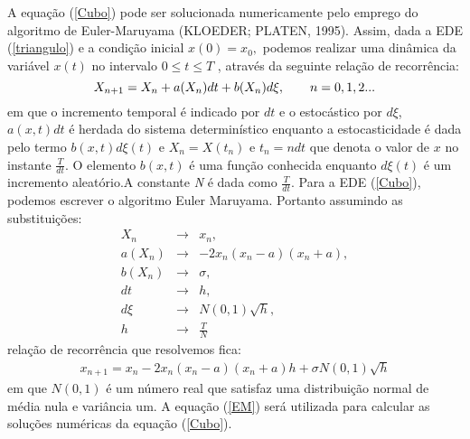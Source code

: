 A equação (\ref{Cubo}) pode ser solucionada numericamente pelo emprego do algoritmo de Euler-Maruyama (KLOEDER; PLATEN, 1995). Assim, dada a EDE  (\ref{triangulo}) e a condição inicial $x(0) = x_0 , $ podemos realizar uma dinâmica da variável $x(t)$ no intervalo  $0 \leq t \leq T$ , através da seguinte relação de recorrência:
\begin{equation}\label{FormaGeralEDE}
X_{n+1} = X_{n} + a(X_{n})dt + b(X_{n})d\xi , \hspace{0.7cm} n = 0,1,2... 
\end{equation}
em que o incremento temporal é indicado por $dt$ e o estocástico por $d\xi$, $a(x,t)dt$ é herdada do sistema determinístico enquanto a estocasticidade é dada pelo termo $b(x,t)d\xi(t)$ e $X_{n} = X(t_{n})$ e $t_{n} = ndt$ que denota o valor de $x$ no instante $\frac{T}{dt}$. O elemento $b(x,t)$ é uma função conhecida enquanto $d\xi(t)$ é um incremento aleatório.A constante \textit{N} é dada como $\frac{T}{dt}$. Para a EDE (\ref{Cubo}), podemos escrever o algoritmo Euler Maruyama. Portanto assumindo as substituições:
\begin{eqnarray}
X_{n} &\rightarrow & x_{n}, \label{teste1}   \\
a(X_{n}) &\rightarrow & -2x_{n}(x_{n}-a)(x_{n}+a), \label{teste2} \\
b(X_{n}) &\rightarrow & {\sigma}, \label{teste3} \\
dt &\rightarrow & h, \label{teste4} \\
d\xi &\rightarrow & N(0,1) \sqrt{h}, \label{teste5} \\
h &\rightarrow & \frac{T}{N}
\end{eqnarray}
relação de recorrência que resolvemos fica:
\begin{eqnarray}\label{EM}
x_{n+1} = x_{n} - 2x_{n}(x_{n} - a)(x_{n} + a)h + \sigma N(0,1) \sqrt{h}
\end{eqnarray}
em que $N(0,1)$ é um número real que satisfaz uma distribuição normal de média nula e variância um. A equação (\ref{EM}) será utilizada para calcular as soluções numéricas da equação (\ref{Cubo}).
